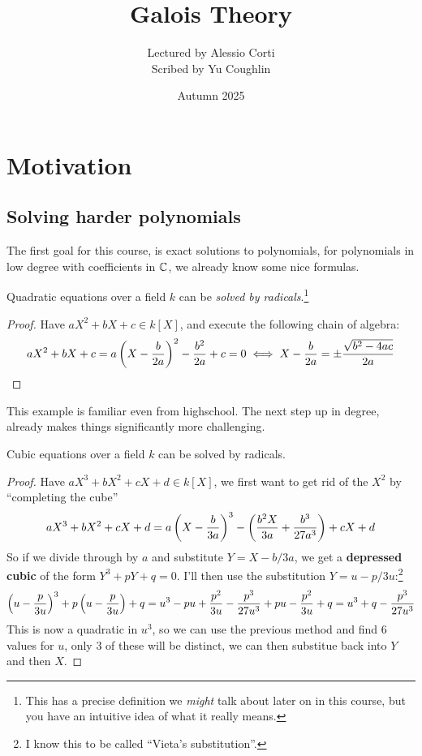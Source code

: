 \documentclass{article}
\begin{document}
\title{Galois Theory}
\author{Lectured by Alessio Corti \\
Scribed by Yu Coughlin}
\date{Autumn 2025}

\maketitle

\tableofcontents

\section{Motivation}

\subsection{Solving harder polynomials}

The first goal for this course, is exact solutions to polynomials, for polynomials in low degree with coefficients in $\mathbb{C}$, we already know some nice formulas.

\begin{proposition}
    Quadratic equations over a field $k$ can be \textit{solved by radicals}.\footnote{This has a precise definition we \textit{might} talk about later on in this course, but you have an intuitive idea of what it really means.}
    \begin{proof}
        Have $aX^2+bX+c\in k[X]$, and execute the following chain of algebra: \[
            aX^2 + bX + c = a\left( X-\frac{b}{2a} \right)^2-\frac{b^2}{2a} + c = 0 \iff X -\frac{b}{2a} = \pm\frac{\sqrt{b^2-4ac}}{2a}\qedhere
        \]
    \end{proof}
\end{proposition}

This example is familiar even from highschool. The next step up in degree, already makes things significantly more challenging.

\begin{proposition}
    Cubic equations over a field $k$ can be solved by radicals.
    \begin{proof}
        Have $aX^3+bX^2+cX+d\in k[X]$, we first want to get rid of the $X^2$ by ``completing the cube''\[
        aX^3+bX^2+cX+d = a\left( X-\frac{b}{3a} \right)^3 - \left( \frac{b^2X}{3a} + \frac{b^3}{27a^3} \right) + cX + d 
        \] So if we divide through by $a$ and substitute $Y=X-b/3a$, we get a \textbf{depressed cubic} of the form $Y^3+pY+q=0$. I'll then use the substitution $Y = u - p/3u$:\footnote{I know this to be called ``Vieta's substitution''.} \[
        \left( u-\frac{p}{3u} \right)^3 + p\left( u-\frac{p}{3u} \right) + q = u^3 - pu + \frac{p^2}{3u} - \frac{p^3}{27u^3} + pu - \frac{p^2}{3u} + q = u^3 + q - \frac{p^3}{27u^3}
        \] This is now a quadratic in $u^3$, so we can use the previous method and find $6$ values for $u$, only $3$ of these will be distinct, we can then substitue back into $Y$ and then $X$.
    \end{proof}
\end{proposition}
\end{document}
